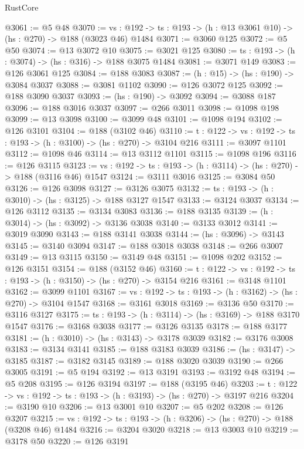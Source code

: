 \begin{lexlean}{RustCore}
\begin{coremodule}
@3061 := @5 @48
@3070 := {vs : @192} -> {ts : @193} -> (h : @13 @3061 @10) -> (hs : @270) -> @188 (@3023 @46) @1484
@3071 := @3060 @125
@3072 := @5 @50
@3074 := @13 @3072 @10
@3075 := @3021 @125
@3080 := {ts : @193} -> (h : @3074) -> (hs : @316) -> @188 @3075 @1484
@3081 := @3071 @149
@3083 := @126 @3061 @125
@3084 := @188 @3083
@3087 := (h : @15) -> (hs : @190) -> @3084 @3037
@3088 := @3081 @1102
@3090 := @126 @3072 @125
@3092 := @188 @3090 @3037
@3093 := (hs : @190) -> @3092
@3094 := @3088 @187
@3096 := @188 @3016 @3037
@3097 := @266 @3011
@3098 := @1098 @198
@3099 := @13 @3098
@3100 := @3099 @48
@3101 := @1098 @194
@3102 := @126 @3101
@3104 := @188 (@3102 @46)
@3110 := {t : @122} -> {vs : @192} -> {ts : @193} -> (h : @3100) -> (hs : @270) -> @3104 @216
@3111 := @3097 @1101
@3112 := @1098 @46
@3114 := @13 @3112 @1101
@3115 := @1098 @196
@3116 := @126 @3115
@3123 := {vs : @192} -> {ts : @193} -> (h : @3114) -> (hs : @270) -> @188 (@3116 @46) @1547
@3124 := @3111 @3016
@3125 := @3084 @50
@3126 := @126 @3098
@3127 := @3126 @3075
@3132 := {ts : @193} -> (h : @3010) -> (hs : @3125) -> @188 @3127 @1547
@3133 := @3124 @3037
@3134 := @126 @3112
@3135 := @3134 @3083
@3136 := @188 @3135
@3139 := (h : @3014) -> (hs : @3092) -> @3136 @3038
@3140 := @3133 @3012
@3141 := @3019 @3090
@3143 := @188 @3141 @3038
@3144 := (hs : @3096) -> @3143
@3145 := @3140 @3094
@3147 := @188 @3018 @3038
@3148 := @266 @3007
@3149 := @13 @3115
@3150 := @3149 @48
@3151 := @1098 @202
@3152 := @126 @3151
@3154 := @188 (@3152 @46)
@3160 := {t : @122} -> {vs : @192} -> {ts : @193} -> (h : @3150) -> (hs : @270) -> @3154 @216
@3161 := @3148 @1101
@3162 := @3099 @1101
@3167 := {vs : @192} -> {ts : @193} -> (h : @3162) -> (hs : @270) -> @3104 @1547
@3168 := @3161 @3018
@3169 := @3136 @50
@3170 := @3116 @3127
@3175 := {ts : @193} -> (h : @3114) -> (hs : @3169) -> @188 @3170 @1547
@3176 := @3168 @3038
@3177 := @3126 @3135
@3178 := @188 @3177
@3181 := (h : @3010) -> (hs : @3143) -> @3178 @3039
@3182 := @3176 @3008
@3183 := @3134 @3141
@3185 := @188 @3183 @3039
@3186 := (hs : @3147) -> @3185
@3187 := @3182 @3145
@3189 := @188 @3020 @3039
@3190 := @266 @3005
@3191 := @5 @194
@3192 := @13 @3191
@3193 := @3192 @48
@3194 := @5 @208
@3195 := @126 @3194
@3197 := @188 (@3195 @46)
@3203 := {t : @122} -> {vs : @192} -> {ts : @193} -> (h : @3193) -> (hs : @270) -> @3197 @216
@3204 := @3190 @10
@3206 := @13 @3001 @10
@3207 := @5 @202
@3208 := @126 @3207
@3215 := {vs : @192} -> {ts : @193} -> (h : @3206) -> (hs : @270) -> @188 (@3208 @46) @1484
@3216 := @3204 @3020
@3218 := @13 @3003 @10
@3219 := @3178 @50
@3220 := @126 @3191

\end{coremodule}
\end{lexlean}
